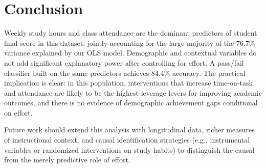 \documentclass[11pt]{article}
\begin{document}
\section{Conclusion}
Weekly study hours and class attendance are the dominant predictors of student final score in this dataset, jointly accounting for the large majority of the 76.7\% variance explained by our OLS model. Demographic and contextual variables do not add significant explanatory power after controlling for effort. A pass/fail classifier built on the same predictors achieves 84.4\% accuracy. The practical implication is clear: in this population, interventions that increase time-on-task and attendance are likely to be the highest-leverage levers for improving academic outcomes, and there is no evidence of demographic achievement gaps conditional on effort.

Future work should extend this analysis with longitudinal data, richer measures of instructional context, and causal identification strategies (e.g., instrumental variables or randomized interventions on study habits) to distinguish the causal from the merely predictive role of effort.
\end{document}
